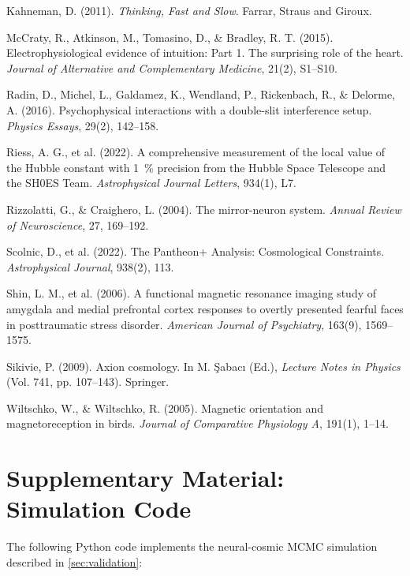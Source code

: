 \documentclass[11pt,a4paper,preprint]{article}
\begin{document}
\begin{thebibliography}{99}
Kahneman, D. (2011). \emph{Thinking, Fast and Slow}. Farrar, Straus and Giroux.

McCraty, R., Atkinson, M., Tomasino, D., \& Bradley, R. T. (2015). Electrophysiological evidence of intuition: Part 1. The surprising role of the heart. \emph{Journal of Alternative and Complementary Medicine}, 21(2), S1--S10.

Radin, D., Michel, L., Galdamez, K., Wendland, P., Rickenbach, R., \& Delorme, A. (2016). Psychophysical interactions with a double-slit interference setup. \emph{Physics Essays}, 29(2), 142--158.

Riess, A. G., et al. (2022). A comprehensive measurement of the local value of the Hubble constant with \SI{1}{\percent} precision from the Hubble Space Telescope and the SH0ES Team. \emph{Astrophysical Journal Letters}, 934(1), L7.

Rizzolatti, G., \& Craighero, L. (2004). The mirror-neuron system. \emph{Annual Review of Neuroscience}, 27, 169--192.

Scolnic, D., et al. (2022). The Pantheon+ Analysis: Cosmological Constraints. \emph{Astrophysical Journal}, 938(2), 113.

Shin, L. M., et al. (2006). A functional magnetic resonance imaging study of amygdala and medial prefrontal cortex responses to overtly presented fearful faces in posttraumatic stress disorder. \emph{American Journal of Psychiatry}, 163(9), 1569--1575.

Sikivie, P. (2009). Axion cosmology. In M. \c{S}abac{\i} (Ed.), \emph{Lecture Notes in Physics} (Vol. 741, pp. 107--143). Springer.

Wiltschko, W., \& Wiltschko, R. (2005). Magnetic orientation and magnetoreception in birds. \emph{Journal of Comparative Physiology A}, 191(1), 1--14.

\end{thebibliography}

\appendix

\section{Supplementary Material: Simulation Code}\label{app:code}

The following Python code implements the neural-cosmic MCMC simulation described in \cref{sec:validation}:
\end{document}
